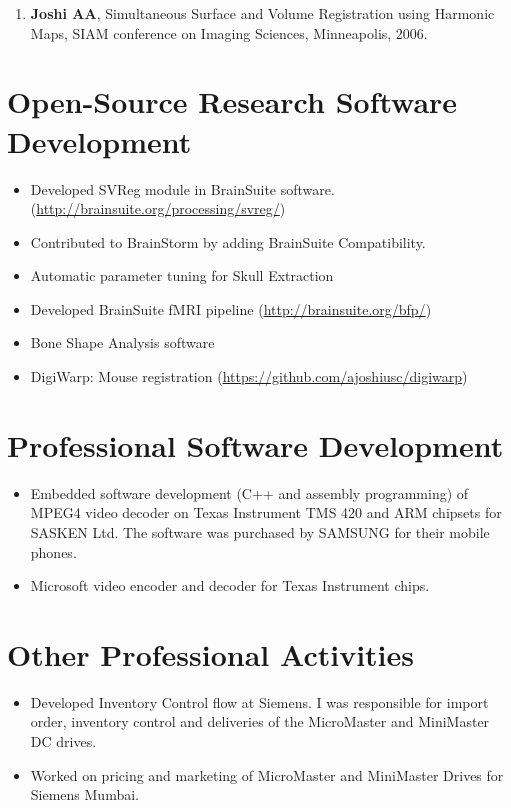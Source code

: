 \documentclass[overlapped,line,letterpaper]{res}
\begin{document}
\begin{resume}
\begin{enumerate}
    \item \textbf{Joshi AA}, Simultaneous Surface and Volume Registration using Harmonic Maps, SIAM conference on Imaging Sciences, Minneapolis, 2006.
\end{enumerate}

\section{Open-Source Research Software Development}
\begin{itemize}
    \item Developed SVReg module in BrainSuite software. (\url{http://brainsuite.org/processing/svreg/})
    \item Contributed to BrainStorm by adding BrainSuite Compatibility.
    \item Automatic parameter tuning for Skull Extraction 
    \item Developed BrainSuite fMRI pipeline (\url{http://brainsuite.org/bfp/})
    \item Bone Shape Analysis software
    \item DigiWarp: Mouse registration (\url{https://github.com/ajoshiusc/digiwarp})
\end{itemize}

\section{Professional Software Development}
\begin{itemize}
    \item Embedded software development (C++ and assembly programming) of MPEG4 video decoder on Texas Instrument TMS 420 and ARM chipsets for SASKEN Ltd. The software was purchased by SAMSUNG for their mobile phones. 
    \item Microsoft video encoder and decoder for Texas Instrument chips.
    \end{itemize}

\section{Other Professional Activities}
\begin{itemize} 
    \item Developed Inventory Control flow at Siemens. I was responsible for import order, inventory control and deliveries of the MicroMaster and MiniMaster DC drives.
    \item Worked on pricing and marketing of MicroMaster and MiniMaster Drives for Siemens Mumbai.
\end{itemize}


\end{resume}
\end{document}
